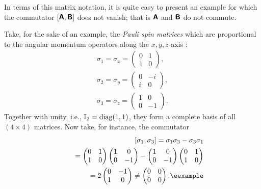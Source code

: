 {\color{blue}
\bexample
In terms of this matrix notation, it is quite easy to present an example
for which the commutator
$
[\textsf{\textbf{A}}, \textsf{\textbf{B}} ]
$
does not vanish; that is
$\textsf{\textbf{A}}$  and $\textsf{\textbf{B}}$
do not commute.

Take, for the sake of an example, the
{\em Pauli spin matrices}
which are proportional to the angular momentum operators along the $x,y,z$-axis
\cite{schiff-55}:
\begin{equation}
\begin{split}
\sigma_1=\sigma_x
=
\begin{pmatrix}
0&1\\
1&0
\end{pmatrix}
,   \\
\sigma_2=\sigma_y
=
\begin{pmatrix}
0&-i\\
i&0
\end{pmatrix}
,   \\
\sigma_3=\sigma_z
=
\begin{pmatrix}
1&0\\
0&-1
\end{pmatrix}
.
\end{split}
\end{equation}
Together with unity, i.e., ${\Bbb I}_2=\textrm{diag}(1,1)$,
they form a complete basis of all $(4\times 4)$ matrices.
Now take, for instance, the commutator
\begin{equation}
\begin{split}
[\sigma_1,\sigma_3]= \sigma_1\sigma_3-\sigma_3\sigma_1\\
\qquad
=
\begin{pmatrix}
0&1\\
1&0
\end{pmatrix}
\begin{pmatrix}
1&0\\
0&-1
\end{pmatrix}
-
\begin{pmatrix}
1&0\\
0&-1
\end{pmatrix}
\begin{pmatrix}
0&1\\
1&0
\end{pmatrix}
\\
\qquad
=  2
\begin{pmatrix}
0&-1\\
1&0
\end{pmatrix}
\neq
\begin{pmatrix}
0&0\\
0&0
\end{pmatrix}
.    \textrm{\eexample}
\end{split}
\end{equation}
}


